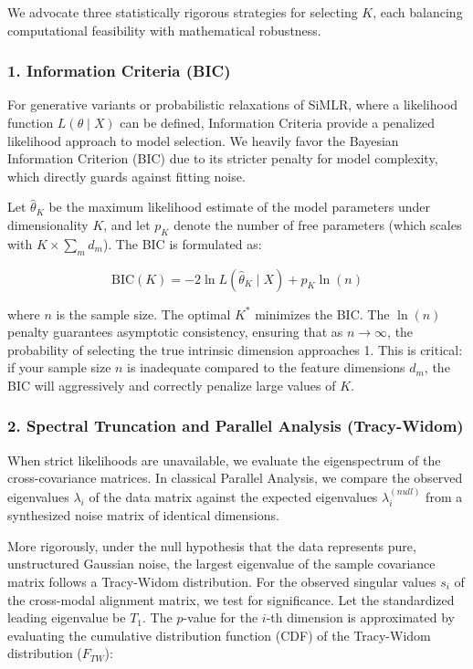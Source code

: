 \documentclass[
  letterpaper,
]{report}
\begin{document}
We advocate three statistically rigorous strategies for selecting \(K\),
each balancing computational feasibility with mathematical robustness.

\subsubsection{1. Information Criteria
(BIC)}\label{information-criteria-bic}

For generative variants or probabilistic relaxations of SiMLR, where a
likelihood function \(L(\theta \mid X)\) can be defined, Information
Criteria provide a penalized likelihood approach to model selection. We
heavily favor the Bayesian Information Criterion (BIC) due to its
stricter penalty for model complexity, which directly guards against
fitting noise.

Let \(\hat{\theta}_K\) be the maximum likelihood estimate of the model
parameters under dimensionality \(K\), and let \(p_K\) denote the number
of free parameters (which scales with \(K \times \sum_{m} d_m\)). The
BIC is formulated as:

\[
\text{BIC}(K) = -2 \ln L(\hat{\theta}_K \mid X) + p_K \ln(n)
\]

where \(n\) is the sample size. The optimal \(K^*\) minimizes the BIC.
The \(\ln(n)\) penalty guarantees asymptotic consistency, ensuring that
as \(n \to \infty\), the probability of selecting the true intrinsic
dimension approaches 1. This is critical: if your sample size \(n\) is
inadequate compared to the feature dimensions \(d_m\), the BIC will
aggressively and correctly penalize large values of \(K\).

\subsubsection{2. Spectral Truncation and Parallel Analysis
(Tracy-Widom)}\label{spectral-truncation-and-parallel-analysis-tracy-widom}

When strict likelihoods are unavailable, we evaluate the eigenspectrum
of the cross-covariance matrices. In classical Parallel Analysis, we
compare the observed eigenvalues \(\lambda_i\) of the data matrix
against the expected eigenvalues \(\lambda_i^{(null)}\) from a
synthesized noise matrix of identical dimensions.

More rigorously, under the null hypothesis that the data represents
pure, unstructured Gaussian noise, the largest eigenvalue of the sample
covariance matrix follows a Tracy-Widom distribution. For the observed
singular values \(s_i\) of the cross-modal alignment matrix, we test for
significance. Let the standardized leading eigenvalue be \(T_1\). The
\(p\)-value for the \(i\)-th dimension is approximated by evaluating the
cumulative distribution function (CDF) of the Tracy-Widom distribution
(\(F_{TW}\)):
\end{document}
